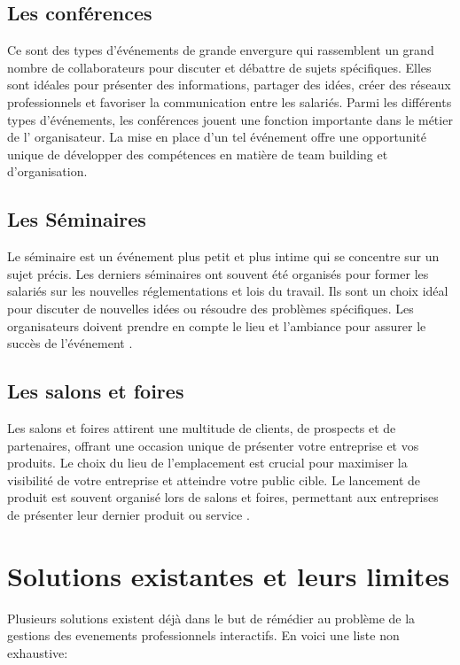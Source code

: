 \subsection{ Les conférences}

Ce sont des types d'événements de grande envergure 
qui rassemblent un grand nombre de collaborateurs 
pour discuter et débattre de sujets spécifiques.
Elles sont idéales pour présenter des informations,
partager des idées, créer des réseaux professionnels
et favoriser la communication entre les salariés. 
Parmi les différents types d'événements, les conférences 
jouent une fonction importante dans le métier de l' organisateur.
La mise en place d'un tel événement offre une opportunité unique
de développer des compétences en matière de team building et d'organisation.\cite{evenementsprofessionnel}
\subsection{ Les Séminaires}

Le séminaire est un événement plus petit et 
plus intime qui se concentre sur un sujet précis. 
Les derniers séminaires ont souvent été organisés 
pour former les salariés sur les nouvelles réglementations et lois du travail.
Ils sont un choix idéal pour discuter de nouvelles idées ou 
résoudre des problèmes spécifiques.
Les organisateurs doivent prendre en compte le lieu et l'ambiance pour assurer le succès de l'événement \cite{evenementsprofessionnel}.
\subsection{Les salons et foires}

Les salons et foires attirent une multitude de clients, de prospects 
et de partenaires, offrant une occasion unique de présenter votre entreprise et vos produits.
Le choix du lieu de l'emplacement est crucial pour maximiser la visibilité de votre entreprise 
et atteindre votre public cible.
Le lancement de produit est souvent organisé lors de salons et foires, permettant aux entreprises 
de présenter leur dernier produit ou service \cite{evenementsprofessionnel}.

\section{Solutions existantes et leurs limites}
Plusieurs solutions existent déjà dans le but de rémédier au problème de la gestions des evenements professionnels interactifs. En voici une liste
non exhaustive:
